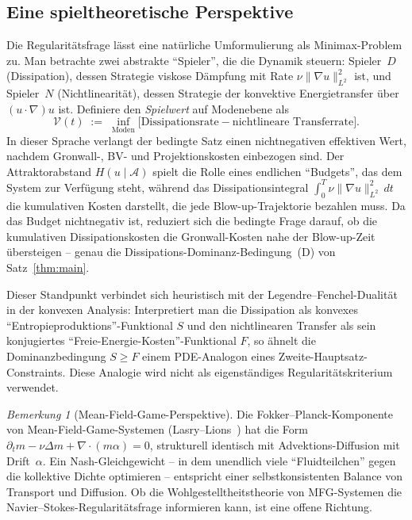 \documentclass[12pt,a4paper]{article}
\theoremstyle{definition}
\theoremstyle{plain}
\theoremstyle{remark}
\newtheorem{remark}[definition]{Bemerkung}
\begin{document}
\subsection{Eine spieltheoretische Perspektive}

Die Regularitätsfrage lässt eine natürliche Umformulierung als Minimax-Problem zu. Man betrachte zwei abstrakte ``Spieler'', die die Dynamik steuern: Spieler~$D$ (Dissipation), dessen Strategie viskose Dämpfung mit Rate $\nu\|\nabla u\|_{L^2}^2$ ist, und Spieler~$N$ (Nichtlinearität), dessen Strategie der konvektive Energietransfer über $(u\cdot\nabla)u$ ist. Definiere den \emph{Spielwert} auf Modenebene als
\begin{equation}
    \mathcal{V}(t) \;:=\; \inf_{\text{Moden}} \bigl[\text{Dissipationsrate} - \text{nichtlineare Transferrate}\bigr].
\end{equation}
In dieser Sprache verlangt der bedingte Satz einen nichtnegativen effektiven Wert, nachdem Gronwall-, BV- und Projektionskosten einbezogen sind. Der Attraktorabstand $H(u\mid\mathcal{A})$ spielt die Rolle eines endlichen ``Budgets'', das dem System zur Verfügung steht, während das Dissipationsintegral $\int_0^T \nu\|\nabla u\|_{L^2}^2\,dt$ die kumulativen Kosten darstellt, die jede Blow-up-Trajektorie bezahlen muss. Da das Budget nichtnegativ ist, reduziert sich die bedingte Frage darauf, ob die kumulativen Dissipationskosten die Gronwall-Kosten nahe der Blow-up-Zeit übersteigen -- genau die Dissipations-Dominanz-Bedingung~(D) von Satz~\ref{thm:main}.

Dieser Standpunkt verbindet sich heuristisch mit der Legendre--Fenchel-Dualität in der konvexen Analysis: Interpretiert man die Dissipation als konvexes ``Entropieproduktions''-Funktional $S$ und den nichtlinearen Transfer als sein konjugiertes ``Freie-Energie-Kosten''-Funktional $F$, so ähnelt die Dominanzbedingung $S \ge F$ einem PDE-Analogon eines Zweite-Hauptsatz-Constraints. Diese Analogie wird nicht als eigenständiges Regularitätskriterium verwendet.

\begin{remark}[Mean-Field-Game-Perspektive]
Die Fokker--Planck-Komponente von Mean-Field-Game-Systemen
(Lasry--Lions~\cite{LasryLions2007}) hat die Form
$\partial_t m - \nu\Delta m + \nabla\cdot(m\alpha) = 0$,
strukturell identisch mit Advektions-Diffusion mit Drift~$\alpha$.
Ein Nash-Gleichgewicht -- in dem unendlich viele ``Fluidteilchen'' gegen
die kollektive Dichte optimieren -- entspricht einer selbstkonsistenten
Balance von Transport und Diffusion. Ob die Wohlgestelltheitstheorie
von MFG-Systemen die Navier--Stokes-Regularitätsfrage informieren kann,
ist eine offene Richtung.
\end{remark}
\end{document}
